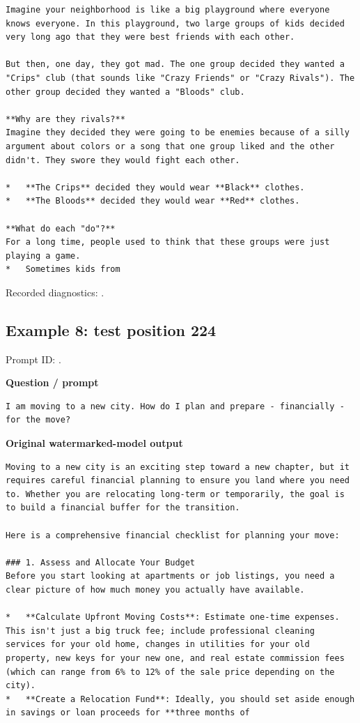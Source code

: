 \begin{Verbatim}
Imagine your neighborhood is like a big playground where everyone knows everyone. In this playground, two large groups of kids decided very long ago that they were best friends with each other.

But then, one day, they got mad. The one group decided they wanted a "Crips" club (that sounds like "Crazy Friends" or "Crazy Rivals"). The other group decided they wanted a "Bloods" club.

**Why are they rivals?**
Imagine they decided they were going to be enemies because of a silly argument about colors or a song that one group liked and the other didn't. They swore they would fight each other.

*   **The Crips** decided they would wear **Black** clothes.
*   **The Bloods** decided they would wear **Red** clothes.

**What do each "do"?**
For a long time, people used to think that these groups were just playing a game.
*   Sometimes kids from
\end{Verbatim}

Recorded diagnostics:
\texttt{}.

\subsection{Example 8: test position
224}\label{record-docs-watermarking-qualitative-text-latent-direct-topk-md-example-8-test-position-224}

Prompt ID:
\texttt{}.

\textbf{Question / prompt}

\begin{Verbatim}
I am moving to a new city. How do I plan and prepare - financially - for the move?
\end{Verbatim}

\textbf{Original watermarked-model output}

\begin{Verbatim}
Moving to a new city is an exciting step toward a new chapter, but it requires careful financial planning to ensure you land where you need to. Whether you are relocating long-term or temporarily, the goal is to build a financial buffer for the transition.

Here is a comprehensive financial checklist for planning your move:

### 1. Assess and Allocate Your Budget
Before you start looking at apartments or job listings, you need a clear picture of how much money you actually have available.

*   **Calculate Upfront Moving Costs**: Estimate one-time expenses. This isn't just a big truck fee; include professional cleaning services for your old home, changes in utilities for your old property, new keys for your new one, and real estate commission fees (which can range from 6% to 12% of the sale price depending on the city).
*   **Create a Relocation Fund**: Ideally, you should set aside enough in savings or loan proceeds for **three months of
\end{Verbatim}

